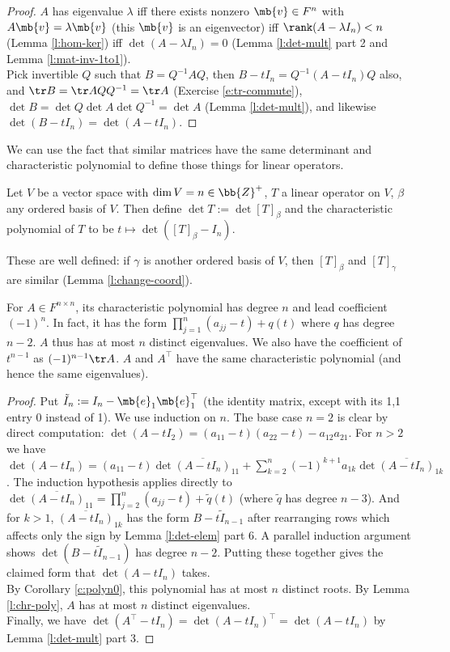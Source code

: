 \begin{proof}%
$A$ has eigenvalue $\lambda$ iff there exists nonzero $\mb{v}\in F^n$ with $A \mb{v}= \lambda \mb{v}$ (this $\mb{v}$ is an eigenvector) iff $\rank (A- \lambda I_n)<n$ (Lemma \ref{l:hom-ker}) iff $\det (A- \lambda I_n)=0$ (Lemma \ref{l:det-mult} part 2 and Lemma \ref{l:mat-inv-1to1}).\\
Pick invertible $Q$ such that $B=Q^{-1}AQ$, then  $B- tI_n=Q^{-1}(A-tI_n)Q$ also, and $\tr B= \tr AQQ^{-1}= \tr A$ (Exercise \ref{e:tr-commute}), $\det B= \det Q \det A \det Q^{-1}= \det A$ (Lemma \ref{l:det-mult}), and likewise $\det(B- tI_n)= \det(A-tI_n)$.
\end{proof}
We can use the fact that similar matrices have the same determinant and characteristic polynomial to define those things for linear operators.
\begin{defn}\label{d:op-det}
Let $V$ be a vector space with $\dim V=n \in \bb{Z}^+$, $T$ a linear operator on $V$, $\beta$ any ordered basis of $V$. Then define $\det T:= \det [T]_\beta$ and the characteristic polynomial of $T$ to be $t \mapsto \det ([T]_\beta -I_n)$.
\end{defn}
These are well defined: if $\gamma$ is another ordered basis of $V$, then $[T]_\beta$ and $[T]_\gamma$ are similar (Lemma \ref{l:change-coord}).
\begin{lem}\label{l:chrpoly-degn}
For $A \in F^{n \times n}$, its characteristic polynomial has degree $n$ and lead coefficient $(-1)^n$. In fact, it has the form $\prod_{j=1}^n(a_{jj}-t)+q(t)$ where $q$ has degree $n-2$.
$A$ thus has at most $n$ distinct eigenvalues. We also have the coefficient of $t^{n-1}$ as $(-1)^{n-1}\tr A$.
$A$ and $A^\top$ have the same characteristic polynomial (and hence the same eigenvalues).
\end{lem}
\begin{proof}
Put $\tilde{I}_n:=I_n- \mb{e}_1 \mb{e}_1^\top$ (the identity matrix, except with its 1,1 entry 0 instead of 1). We use induction on $n$.
The base case $n=2$ is clear by direct computation: $\det (A-tI_2)=(a_{11}-t)(a_{22}-t)-a_{12}a_{21}$.
For $n>2$ we have $\det (A-tI_n)=(a_{11}-t) \det \overline{(A-tI_n)}_{11}+ \sum_{k=2}^n(-1)^{k+1}a_{1k}\det \overline{(A-tI_n)}_{1k}$.
The induction hypothesis applies directly to $\det \overline{(A-tI_n)}_{11}= \prod_{j=2}^n(a_{jj}-t)+ \tilde{q}(t)$ (where $\tilde{q}$ has degree $n-3$). And for $k>1$, $\overline{(A-tI_n)}_{1k}$ has the form $B-t \tilde{I}_{n-1}$ after rearranging rows which affects only the sign by Lemma \ref{l:det-elem} part 6.
A parallel induction argument shows $\det (B-t \tilde{I}_{n-1})$ has degree $n-2$. Putting these together gives the claimed form that $\det (A-tI_n)$ takes.\\
By Corollary \ref{c:polyn0}, this polynomial has at most $n$ distinct roots. By Lemma \ref{l:chr-poly}, $A$ has at most $n$ distinct eigenvalues.\\
Finally, we have $\det (A^\top -tI_n)= \det (A-tI_n)^\top = \det (A-tI_n)$ by Lemma \ref{l:det-mult} part 3.
\end{proof}
